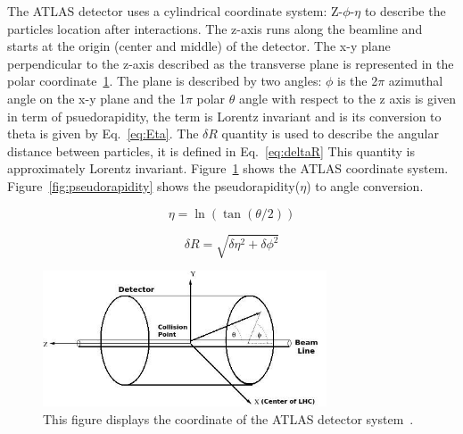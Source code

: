 The ATLAS detector uses a cylindrical coordinate system: Z-$\phi$-$\eta$ to describe the particles location after interactions.
The z-axis runs along the beamline and starts at the origin (center and middle) of the detector. The x-y plane perpendicular to the z-axis described as the transverse plane is represented in the polar coordinate~\ref{fig:Coordinates}. The plane is described by two angles: $\phi$ is the 2$\pi$ azimuthal angle on the x-y plane and the 1$\pi$ polar $\theta$ angle with respect to the z axis is given in term of psuedorapidity, the term is Lorentz invariant and is its conversion to theta is given
by Eq.~\ref{eq:Eta}. The $\delta R$ quantity is used to describe the angular distance between particles, it is defined in Eq.~\ref{eq:deltaR} This quantity is approximately Lorentz invariant. Figure~\ref{fig:Coordinates} shows the ATLAS coordinate system. Figure~\ref{fig:pseudorapidity} shows the pseudorapidity($\eta$) to angle conversion. 

\begin{equation}
    \eta=\ln(\tan(\theta/2))
    \label{eq:Eta}
\end{equation}

\begin{equation}
\delta R=\sqrt{\delta\eta^{2}+\delta\phi^{2}} 
\label{eq:deltaR}
\end{equation}

\begin{figure}[!htb]
    \begin{center}
        \includegraphics[width=0.75\textwidth]{figures/chapter_ATLAS/Coordinates}
        \caption{
            This figure displays the coordinate of the ATLAS detector system~\cite{2008}.
        }
        \label{fig:Coordinates}
    \end{center}
\end{figure}

